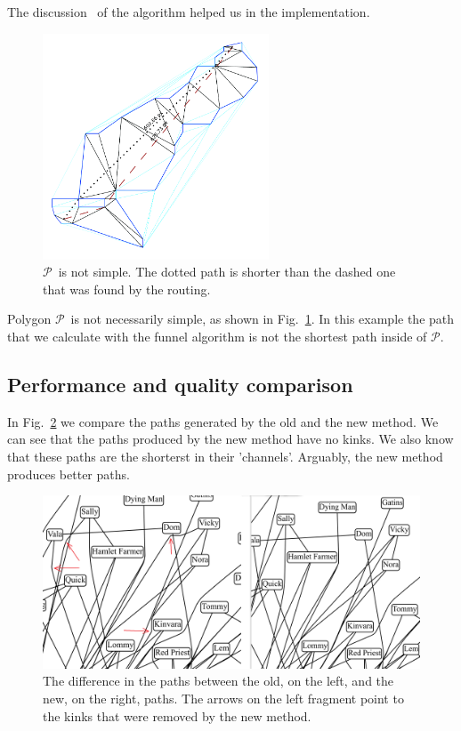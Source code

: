 \documentclass{gd-llncs}
\newcommand{\plg}{$\mathcal{P}$}
\begin{document}
{The discussion~\cite{pathOpt} of the algorithm helped us in the implementation.\\
\begin{figure}[]
  \centering
  \includegraphics*[width=0.6\textwidth]{sleeve_diagonals_not_optimal.pdf}
  \caption{\plg~is not simple. The dotted path is shorter than the dashed one that was found by the routing.}
  \label{fig:non_optimal_path}
\end{figure}
Polygon \plg~is not necessarily simple, as shown in Fig.~\ref{fig:non_optimal_path}.
In this example the path that we calculate with the funnel algorithm is not the shortest path inside of \plg.
\subsection*{Performance and quality comparison}
In Fig.~\ref{fig:improved_routing} we compare the paths generated by the old and the new method. We can see that the paths produced by the new method have no kinks. We also know that these paths are  the shorterst in their 'channels'. Arguably, the new method produces better paths.
\begin{figure}[]
  \centering
  \includegraphics*[width=1\textwidth]{comparison.png}
  \caption{The difference in the paths between the old, on the left, and the new, on the right, paths. The arrows on the left fragment point to the kinks that were removed by the new method.}
  \label{fig:improved_routing}
\end{figure}


}
\end{document}
